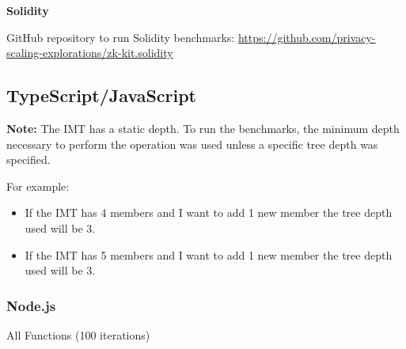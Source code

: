 \documentclass{article}
\begin{document}
\textbf{Solidity}

GitHub repository to run Solidity benchmarks: \url{https://github.com/privacy-scaling-explorations/zk-kit.solidity}

\subsection{TypeScript/JavaScript}

\textbf{Note:} The IMT has a static depth. To run the benchmarks, the minimum depth necessary to perform the operation was used unless a specific tree depth was specified.

For example:

\begin{itemize}
    \item If the IMT has 4 members and I want to add 1 new member the tree depth used will be 3.
    \item If the IMT has 5 members and I want to add 1 new member the tree depth used will be 3.
\end{itemize}

\subsubsection{Node.js}


\datatable

\begin{table}[H]
    \centering
    \caption{All Functions (100 iterations)}
    \pgfplotstabletypeset[
        col sep=comma,
        header=true,
        string type, %
        every head row/.style={before row=\toprule, after row=\midrule},
        every last row/.style={after row=\bottomrule},
    ]{\datatable}
\end{table}

\end{document}
